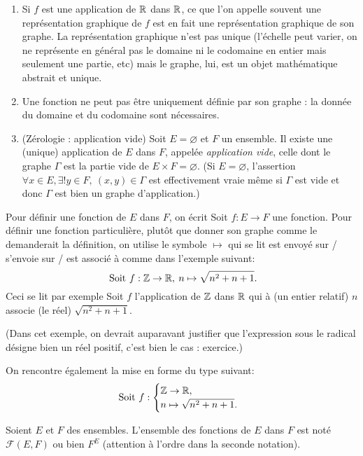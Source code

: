 \begin{remarque}
\begin{enumerate}
\item Si $f$ est une application de $\mathbb{R}$ dans $\mathbb{R}$, ce que l'on appelle souvent une \og représentation graphique de $f$\fg{} est en fait une représentation graphique de son graphe. La représentation graphique n'est pas unique (l'échelle peut varier, on ne représente en général pas le domaine ni le codomaine en entier mais seulement une partie, etc) mais le graphe, lui, est un objet mathématique abstrait et unique.
\item Une fonction ne peut pas être uniquement définie par son graphe : la donnée du domaine et du codomaine sont nécessaires.
\item {} (Zérologie : application vide) Soit $E = \varnothing$ et $F$ un ensemble. Il existe une (unique) application de $E$ dans $F$, appelée \emph{application vide}, celle dont le graphe $\Gamma$ est la partie vide de $E\times F = \varnothing$. (Si $E=\varnothing$,  l'assertion \og $\forall x\in E, \exists! y\in F,\: (x,y)\in \Gamma$\fg{} est effectivement vraie même si $\Gamma$ est vide et donc $\Gamma$ est bien un graphe d'application.)
\end{enumerate}
\end{remarque}

Pour définir une fonction de $E$ dans $F$, on écrit \og Soit $f : E\to F$ une fonction\fg. Pour définir une fonction particulière, plutôt que donner son graphe comme le demanderait la définition, on utilise le symbole \og$\mapsto$\fg{} qui se lit \og est envoyé sur / s'envoie sur / est associé à \fg{} comme dans l'exemple suivant:
\[
\text{ Soit } f :\mathbb{Z} \to \mathbb{R},\: n\mapsto \sqrt{n^2+n+1}.
\]
Ceci se lit par exemple \og Soit $f$ l'application de $\mathbb{Z}$ dans $\mathbb{R}$ qui à (un entier relatif) $n$ associe (le réel) $\sqrt{n^2+n+1}$\fg.


(Dans cet exemple, on devrait auparavant justifier que l'expression sous le radical désigne bien un réel positif, c'est bien le cas : exercice.)

On rencontre également la mise en forme du type suivant:
\[
\text{ Soit } f :\begin{cases}\mathbb{Z} \to \mathbb{R},\\ n\mapsto \sqrt{n^2+n+1}.\end{cases}
\]
\begin{definition}
Soient $E$ et $F$ des ensembles. L'ensemble des fonctions de $E$ dans $F$ est noté $\mathcal F(E,F)$ ou bien $F^E$ (attention à l'ordre dans la seconde notation).
\end{definition}


